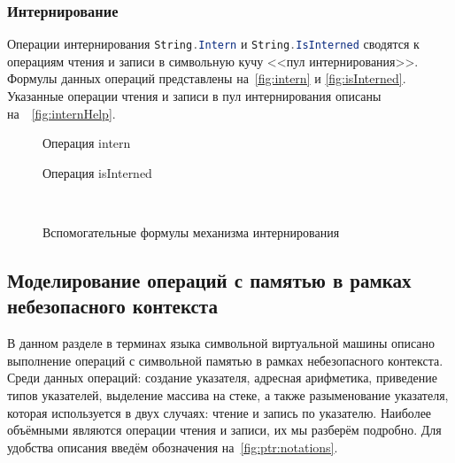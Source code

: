\subsubsection{Интернирование}
Операции интернирования \lstinline[language=csharp]{String.Intern} и \lstinline[language=csharp]{String.IsInterned} сводятся к операциям чтения и записи в символьную кучу <<пул интернирования>>. Формулы данных операций представлены на~\autoref{fig:intern} и \autoref{fig:isInterned}. Указанные операции чтения и записи в пул интернирования описаны на~~\autoref{fig:internHelp}.

\begin{figure}[H]
\centering
\tiny
\setlength{\jot}{1pt}
\begin{mymathbox}
\end{mymathbox}
\normalsize
\caption{Операция intern} \label{fig:intern}
\end{figure}
\begin{figure}[H]
\centering
\tiny
\setlength{\jot}{1pt}
\begin{mymathbox}
\end{mymathbox}
\normalsize
\caption{Операция isInterned} \label{fig:isInterned}
\end{figure}
\begin{figure}[H]
\centering
\tiny
\setlength{\jot}{1pt}
\begin{mymathbox}
 \\
\end{mymathbox}
\normalsize
\caption{Вспомогательные формулы механизма интернирования} \label{fig:internHelp}
\end{figure}

\subsection{Моделирование операций с памятью в рамках небезопасного контекста}

В данном разделе в терминах языка символьной виртуальной машины описано выполнение операций с символьной памятью в рамках небезопасного контекста. Среди данных операций: создание указателя, адресная арифметика, приведение типов указателей, выделение массива на стеке, а также разыменование указателя, которая используется в двух случаях: чтение и запись по указателю. Наиболее объёмными являются операции чтения и записи, их мы разберём подробно. Для удобства описания введём обозначения на~\autoref{fig:ptr:notations}.

